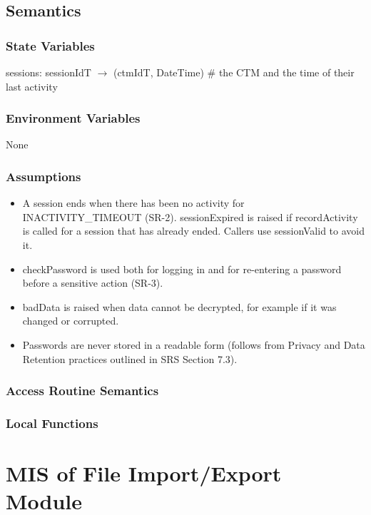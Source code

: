\documentclass[12pt, titlepage]{article}
\begin{document}
\subsection{Semantics}

\subsubsection{State Variables}

sessions: sessionIdT $\rightarrow$ (ctmIdT, DateTime) \# the CTM and the time
of their last activity

\subsubsection{Environment Variables}

None

\subsubsection{Assumptions}

\begin{itemize}
\item A session ends when there has been no activity for INACTIVITY\_TIMEOUT
  (SR-2). sessionExpired is raised if recordActivity is called for a session
  that has already ended. Callers use sessionValid to avoid it.
\item checkPassword is used both for logging in and for re-entering a password
  before a sensitive action (SR-3).
\item badData is raised when data cannot be decrypted, for example if it was
  changed or corrupted.
\item Passwords are never stored in a readable form (follows from Privacy and Data Retention practices outlined in SRS Section 7.3).
\end{itemize}

\subsubsection{Access Routine Semantics}

\subsubsection{Local Functions}

\newpage

\section{MIS of File Import/Export Module} \label{mis:FileIO}
\end{document}
